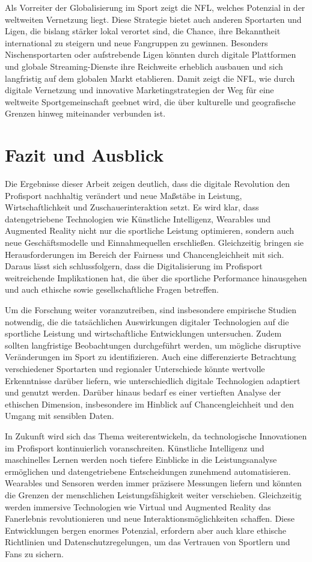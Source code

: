 \documentclass[
  number]{elsarticle}
\begin{document}
Als Vorreiter der Globalisierung im Sport zeigt die NFL, welches
Potenzial in der weltweiten Vernetzung liegt. Diese Strategie bietet
auch anderen Sportarten und Ligen, die bislang stärker lokal verortet
sind, die Chance, ihre Bekanntheit international zu steigern und neue
Fangruppen zu gewinnen. Besonders Nischensportarten oder aufstrebende
Ligen könnten durch digitale Plattformen und globale Streaming-Dienste
ihre Reichweite erheblich ausbauen und sich langfristig auf dem globalen
Markt etablieren. Damit zeigt die NFL, wie durch digitale Vernetzung und
innovative Marketingstrategien der Weg für eine weltweite
Sportgemeinschaft geebnet wird, die über kulturelle und geografische
Grenzen hinweg miteinander verbunden ist.

\section{Fazit und Ausblick}\label{fazit-und-ausblick}

Die Ergebnisse dieser Arbeit zeigen deutlich, dass die digitale
Revolution den Profisport nachhaltig verändert und neue Maßstäbe in
Leistung, Wirtschaftlichkeit und Zuschauerinteraktion setzt. Es wird
klar, dass datengetriebene Technologien wie Künstliche Intelligenz,
Wearables und Augmented Reality nicht nur die sportliche Leistung
optimieren, sondern auch neue Geschäftsmodelle und Einnahmequellen
erschließen. Gleichzeitig bringen sie Herausforderungen im Bereich der
Fairness und Chancengleichheit mit sich. Daraus lässt sich
schlussfolgern, dass die Digitalisierung im Profisport weitreichende
Implikationen hat, die über die sportliche Performance hinausgehen und
auch ethische sowie gesellschaftliche Fragen betreffen.

Um die Forschung weiter voranzutreiben, sind insbesondere empirische
Studien notwendig, die die tatsächlichen Auswirkungen digitaler
Technologien auf die sportliche Leistung und wirtschaftliche
Entwicklungen untersuchen. Zudem sollten langfristige Beobachtungen
durchgeführt werden, um mögliche disruptive Veränderungen im Sport zu
identifizieren. Auch eine differenzierte Betrachtung verschiedener
Sportarten und regionaler Unterschiede könnte wertvolle Erkenntnisse
darüber liefern, wie unterschiedlich digitale Technologien adaptiert und
genutzt werden. Darüber hinaus bedarf es einer vertieften Analyse der
ethischen Dimension, insbesondere im Hinblick auf Chancengleichheit und
den Umgang mit sensiblen Daten.

In Zukunft wird sich das Thema weiterentwickeln, da technologische
Innovationen im Profisport kontinuierlich voranschreiten. Künstliche
Intelligenz und maschinelles Lernen werden noch tiefere Einblicke in die
Leistungsanalyse ermöglichen und datengetriebene Entscheidungen
zunehmend automatisieren. Wearables und Sensoren werden immer präzisere
Messungen liefern und könnten die Grenzen der menschlichen
Leistungsfähigkeit weiter verschieben. Gleichzeitig werden immersive
Technologien wie Virtual und Augmented Reality das Fanerlebnis
revolutionieren und neue Interaktionsmöglichkeiten schaffen. Diese
Entwicklungen bergen enormes Potenzial, erfordern aber auch klare
ethische Richtlinien und Datenschutzregelungen, um das Vertrauen von
Sportlern und Fans zu sichern.
\end{document}
